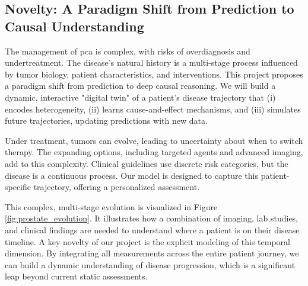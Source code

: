 \documentclass[11pt, a4paper]{article}
\begin{document}
\subsection{Novelty: A Paradigm Shift from Prediction to Causal Understanding}
The management of \gls{pca} is complex, with risks of overdiagnosis and undertreatment. The disease's natural history is a multi-stage process influenced by tumor biology, patient characteristics, and interventions. This project proposes a paradigm shift from prediction to deep causal reasoning. We will build a dynamic, interactive "digital twin" of a patient’s disease trajectory that (i) encodes heterogeneity, (ii) learns cause-and-effect mechanisms, and (iii) simulates future trajectories, updating predictions with new data.

Under treatment, tumors can evolve, leading to uncertainty about when to switch therapy. The expanding options, including targeted agents and advanced imaging, add to this complexity. Clinical guidelines use discrete risk categories, but the disease is a continuous process. Our model is designed to capture this patient-specific trajectory, offering a personalized assessment.

This complex, multi-stage evolution is visualized in Figure \ref{fig:prostate_evolution}. It illustrates how a combination of imaging, lab studies, and clinical findings are needed to understand where a patient is on their disease timeline. A key novelty of our project is the explicit modeling of this temporal dimension. By integrating all measurements across the entire patient journey, we can build a dynamic understanding of disease progression, which is a significant leap beyond current static assessments.
\end{document}
